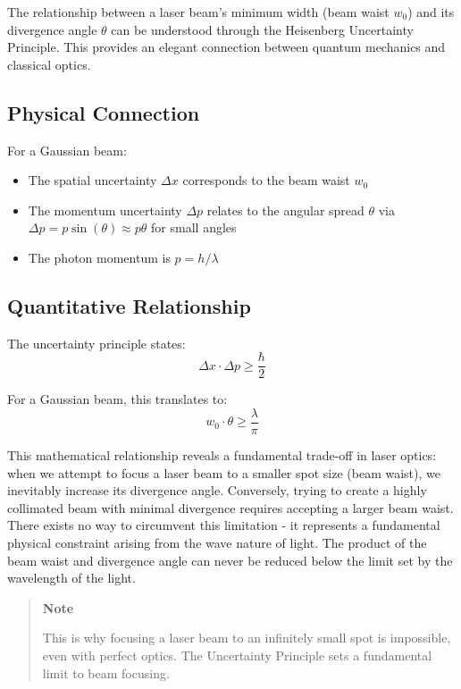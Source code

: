 \documentclass[
  a4paper,
]{book}
\providecommand{\tightlist}{%
  \setlength{\itemsep}{0pt}\setlength{\parskip}{0pt}}
\begin{document}
\begin{tcolorbox}[enhanced jigsaw, coltitle=black, title=\textcolor{quarto-callout-note-color}{\faInfo}\hspace{0.5em}{Gaussian Beam Waist and the Uncertainty Principle}, colframe=quarto-callout-note-color-frame, toprule=.15mm, opacitybacktitle=0.6, left=2mm, opacityback=0, breakable, toptitle=1mm, bottomtitle=1mm, leftrule=.75mm, arc=.35mm, titlerule=0mm, colbacktitle=quarto-callout-note-color!10!white, rightrule=.15mm, bottomrule=.15mm, colback=white]

The relationship between a laser beam's minimum width (beam waist
\(w_0\)) and its divergence angle \(\theta\) can be understood through
the Heisenberg Uncertainty Principle. This provides an elegant
connection between quantum mechanics and classical optics.

\subsection{Physical Connection}\label{physical-connection}

For a Gaussian beam:

\begin{itemize}
\tightlist
\item
  The spatial uncertainty \(\Delta x\) corresponds to the beam waist
  \(w_0\)
\item
  The momentum uncertainty \(\Delta p\) relates to the angular spread
  \(\theta\) via \(\Delta p = p\sin(\theta) \approx p\theta\) for small
  angles
\item
  The photon momentum is \(p = h/\lambda\)
\end{itemize}

\subsection{Quantitative Relationship}\label{quantitative-relationship}

The uncertainty principle states:
\[\Delta x \cdot \Delta p \geq \frac{\hbar}{2}\]

For a Gaussian beam, this translates to:
\[w_0 \cdot \theta \geq \frac{\lambda}{\pi}\]

This mathematical relationship reveals a fundamental trade-off in laser
optics: when we attempt to focus a laser beam to a smaller spot size
(beam waist), we inevitably increase its divergence angle. Conversely,
trying to create a highly collimated beam with minimal divergence
requires accepting a larger beam waist. There exists no way to
circumvent this limitation - it represents a fundamental physical
constraint arising from the wave nature of light. The product of the
beam waist and divergence angle can never be reduced below the limit set
by the wavelength of the light.

\begin{quote}
\textbf{Note}

This is why focusing a laser beam to an infinitely small spot is
impossible, even with perfect optics. The Uncertainty Principle sets a
fundamental limit to beam focusing.
\end{quote}

\end{tcolorbox}
\end{document}
